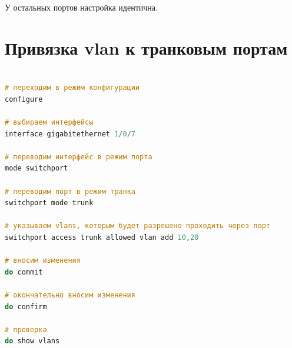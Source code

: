 У остальных портов настройка идентична.

\section{Привязка vlan к транковым портам}

\begin{lstlisting}[language=C, caption={Пример привязки портов в режиме access к vlan}]

# переходим в режим конфигурации
configure

# выбираем интерфейсы
interface gigabitethernet 1/0/7

# переводим интерфейс в режим порта
mode switchport

# переводим порт в режим транка
switchport mode trunk

# указываем vlans, которым будет разрешено проходить через порт 
switchport access trunk allowed vlan add 10,20

# вносим изменения
do commit

# окончательно вносим изменения
do confirm

# проверка
do show vlans
\end{lstlisting}

\endinput